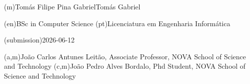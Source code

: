 %
%
\ntauthorname(m){Tomás Filipe Pina Gabriel}{Tomás Gabriel}



%
%
%
\ntauthordegree(en){BSc in Computer Science}
\ntauthordegree(pt){Licenciatura em Engenharia Informática}



%
%
%

%
%
\ntdate(submission){2026-06-12}



%
%
%
%
(a,m){João Carlos Antunes Leitão, Associate Professor, NOVA School of Science and Technology}
(c,m){João Pedro Alves Bordalo, Phd Student, NOVA School of Science and Technology}



